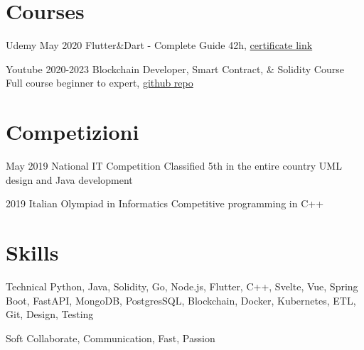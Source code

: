 \documentclass{tccv}
\begin{document}
\section{Courses}

\begin{yearlist}

\item[Udemy]{May 2020}
     {Flutter\&Dart - Complete Guide}
     {42h, \href{https://www.udemy.com/certificate/UC-c6f5a32f-babc-42f9-8a0a-6effadf9e7cd/}{certificate link}}

\item[Youtube]{2020-2023}
    {Blockchain Developer, Smart Contract, \& Solidity Course}
    {Full course beginner to expert, \href{https://github.com/Cyfrin/foundry-full-course-f23}{github repo}}

\end{yearlist}


\section{Competizioni}

\begin{yearlist}

\item[]{May 2019}
     {National IT Competition}
     {Classified 5th in the entire country \newline
     UML design and Java development}

\item[]{2019}
    {Italian Olympiad in Informatics}
    {Competitive programming in C++}

\end{yearlist}


\section{Skills}

\begin{factlist}

\item{Technical}
     {Python, Java, Solidity, Go, Node.js, Flutter, C++, Svelte, Vue, Spring Boot, FastAPI, MongoDB, PostgresSQL, Blockchain, Docker, Kubernetes, ETL, Git, Design, Testing}

\item{Soft}
     {Collaborate, Communication, Fast, Passion}

\end{factlist}
\end{document}
